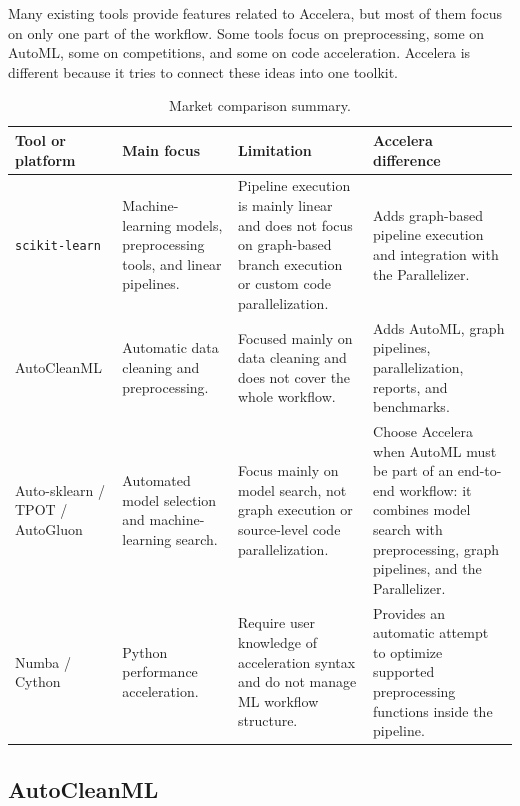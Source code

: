 \documentclass[12pt,a4paper]{report}
\newcommand{\acceleraTableStyle}{%
\small
\renewcommand{\arraystretch}{1.15}
\setlength{\tabcolsep}{4pt}%
}
\begin{document}
Many existing tools provide features related to Accelera, but most of them focus
on only one part of the workflow. Some tools focus on preprocessing, some on
AutoML, some on competitions, and some on code acceleration. Accelera is
different because it tries to connect these ideas into one toolkit.

\begin{table}[!htbp]
\centering
\acceleraTableStyle
\caption{Market comparison summary.}
\label{tab:market-comparison}
\begin{tabular}{p{}p{}p{}p{}}
\toprule
\textbf{Tool or platform} & \textbf{Main focus} & \textbf{Limitation} & \textbf{Accelera difference} \\
\midrule

\texttt{scikit-learn} &
Machine-learning models, preprocessing tools, and linear pipelines. &
Pipeline execution is mainly linear and does not focus on graph-based branch
execution or custom code parallelization. &
Adds graph-based pipeline execution and integration with the Parallelizer. \\
\midrule

AutoCleanML &
Automatic data cleaning and preprocessing. &
Focused mainly on data cleaning and does not cover the whole workflow. &
Adds AutoML, graph pipelines, parallelization, reports, and benchmarks. \\
\midrule

Auto-sklearn / TPOT / AutoGluon &
Automated model selection and machine-learning search. &
Focus mainly on model search, not graph execution or source-level code
parallelization. &
Choose Accelera when AutoML must be part of an end-to-end workflow: it combines
model search with preprocessing, graph pipelines, and the Parallelizer. \\
\midrule

Numba / Cython &
Python performance acceleration. &
Require user knowledge of acceleration syntax and do not manage ML workflow
structure. &
Provides an automatic attempt to optimize supported preprocessing functions
inside the pipeline. \\

\bottomrule
\end{tabular}
\end{table}

\subsection{AutoCleanML}
\end{document}
